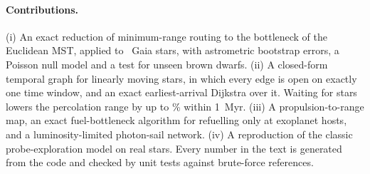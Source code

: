 \paragraph{Contributions.} (i) An exact reduction of minimum-range routing to
the bottleneck of the Euclidean MST, applied to \NStars\ Gaia stars, with
astrometric bootstrap errors, a Poisson null model and a test for unseen brown
dwarfs. (ii) A closed-form temporal graph for linearly moving stars, in which
every edge is open on exactly one time window, and an exact earliest-arrival
Dijkstra over it. Waiting for stars lowers the percolation range by up to
\RedThousand\% within 1~Myr. (iii) A propulsion-to-range map, an exact
fuel-bottleneck algorithm for refuelling only at exoplanet hosts, and a
luminosity-limited photon-sail network. (iv) A reproduction of the classic
probe-exploration model on real stars. Every number in the text is generated
from the code and checked by unit tests against brute-force references.
